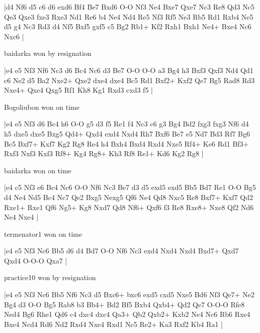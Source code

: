 \makegametitle
|d4 Nf6 d5 c6 d6 exd6 Bf4 Be7 Bxd6 O-O Nf3 Ne4 Bxe7 Qxe7 Nc3 Re8 Qd3 Nc5 Qe3 Qxe3 fxe3 Rxe3 Nd1 Re6 b4 Ne4 Nd4 Re5 Nf3 Rf5 Ne3 Rb5 Rd1 Rxb4 Ne5 d5 g4 Nc3 Rd3 d4 Nf5 Bxf5 gxf5 c5 Bg2 Rb1+ Kf2 Rxh1 Bxh1 Ne4+ Bxe4 Nc6 Nxc6  |

\showboard

baidarka won by resignation

\makegametitle
|e4 e5 Nf3 Nf6 Nc3 d6 Bc4 Nc6 d3 Be7 O-O O-O a3 Bg4 h3 Bxf3 Qxf3 Nd4 Qd1 c6 Ne2 d5 Ba2 Nxe2+ Qxe2 dxe4 dxe4 Bc5 Rd1 Bxf2+ Kxf2 Qe7 Bg5 Rad8 Rd3 Nxe4+ Qxe4 Qxg5 Rf1 Kh8 Kg1 Rxd3 cxd3 f5  |

\showboard

Bogoliubon won on time

\makegametitle
|e4 e5 Nf3 d6 Bc4 h6 O-O g5 d3 f5 Re1 f4 Nc3 c6 g3 Bg4 Bd2 fxg3 fxg3 Nf6 d4 h5 dxe5 dxe5 Bxg5 Qd4+ Qxd4 exd4 Nxd4 Rh7 Bxf6 Be7 e5 Nd7 Bd3 Rf7 Bg6 Bc5 Bxf7+ Kxf7 Kg2 Rg8 Re4 h4 Bxh4 Bxd4 Rxd4 Nxe5 Rf4+ Ke6 Rd1 Bf3+ Rxf3 Nxf3 Kxf3 Rf8+ Kg4 Rg8+ Kh3 Rf8 Re1+ Kd6 Kg2 Rg8  |

\showboard

baidarka won on time

\makegametitle
|e4 c5 Nf3 e6 Bc4 Nc6 O-O Nf6 Nc3 Be7 d3 d5 exd5 exd5 Bb5 Bd7 Re1 O-O Bg5 d4 Ne4 Nd5 Bc4 Nc7 Qe2 Bxg5 Nexg5 Qf6 Ne4 Qd8 Nxc5 Re8 Bxf7+ Kxf7 Qd2 Rxe1+ Rxe1 Qf6 Ng5+ Kg8 Nxd7 Qd8 Nf6+ Qxf6 f3 Re8 Rxe8+ Nxe8 Qf2 Nd6 Ne4 Nxe4  |

\showboard

termenator1 won on time

\makegametitle
|e4 e5 Nf3 Nc6 Bb5 d6 d4 Bd7 O-O Nf6 Nc3 exd4 Nxd4 Nxd4 Bxd7+ Qxd7 Qxd4 O-O-O Qxa7  |

\showboard

practice10 won by resignation

\makegametitle
|e4 e5 Nf3 Nc6 Bb5 Nf6 Nc3 d5 Bxc6+ bxc6 exd5 cxd5 Nxe5 Bd6 Nf3 Qe7+ Ne2 Bg4 d3 O-O Bg5 Rab8 b3 Bb4+ Bd2 Bf5 Bxb4 Qxb4+ Qd2 Qe7 O-O-O Rfe8 Ned4 Bg6 Rhe1 Qd6 c4 dxc4 dxc4 Qa3+ Qb2 Qxb2+ Kxb2 Ne4 Nc6 Rb6 Rxe4 Bxe4 Ncd4 Rd6 Nd2 Rxd4 Nxe4 Rxd1 Nc5 Re2+ Ka3 Rxf2 Kb4 Ra1  |

